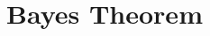 \documentclass[12pt]{article}
\begin{document}
%
%
%
%
%
%
%
%
%
%
%
%
%



\section*{Bayes Theorem}
\end{document}
